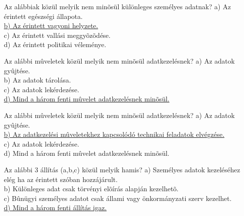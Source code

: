 \begin{frame}


\begin{tcolorbox}[title={176. Kérdés}]
Az alábbiak közül melyik nem minõsül különleges személyes adatnak?
\tcblower
a) Az érintett egészségi állapota.\\
\uline {b) Az érintett vagyoni helyzete.}\\
c) Az érintett vallási meggyõzõdése.\\
d) Az érintett politikai véleménye.
\end{tcolorbox}

\begin{tcolorbox}[title={177. Kérdés}]
Az alábbi mûveletek közül melyik nem minõsül adatkezelésnek?
\tcblower
a) Az adatok gyûjtése.\\
b) Az adatok tárolása.\\
c) Az adatok lekérdezése.\\
\uline {d) Mind a három fenti mûvelet adatkezelésnek minõsül.}
\end{tcolorbox}

\begin{tcolorbox}[title={177/A. Kérdés}]
Az alábbi mûveletek közül melyik nem minõsül adatkezelésnek?
\tcblower
a) Az adatok gyûjtése.\\
\uline {b) Az adatkezelési mûveletekhez kapcsolódó technikai feladatok elvégzése.}\\
c) Az adatok lekérdezése.\\
d) Mind a három fenti mûvelet adatkezelésnek minõsül.
\end{tcolorbox}

\begin{tcolorbox}[title={178. Kérdés}]
Az alábbi 3 állítás (a,b,c) közül melyik hamis?
\tcblower
a) Személyes adatok kezeléséhez elég ha az érintett szóban hozzájárult.\\
b) Különleges adat csak törvényi elõírás alapján kezelhetõ.\\
c) Bûnügyi személyes adatot csak állami vagy önkormányzati szerv kezelhet.\\
\uline {d) Mind a három fenti állítás igaz.}
\end{tcolorbox}

\end{frame}


